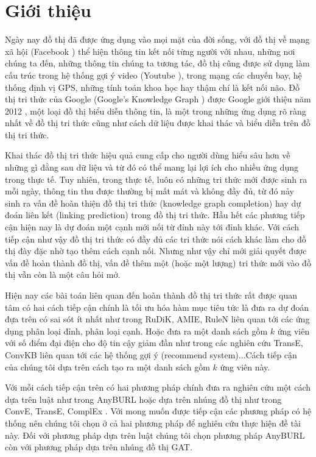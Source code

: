 \chapter{Giới thiệu}
\label{Chapter1}

Ngày nay đồ thị đã được ứng dụng vào mọi mặt của đời sống, với đồ thị về mạng xã hội (Facebook \cite{ugander2011anatomy}) thể hiện thông tin kết nối từng người với nhau, những nơi chúng ta đến, những thông tin chúng ta tương tác, đồ thị cũng được sử dụng làm cấu trúc trong hệ thống gợi ý video (Youtube \cite{baluja2008video}), trong mạng các chuyến bay, hệ thống định vị GPS, những tính toán khoa học hay thậm chí là kết nối não. Đồ thị tri thức của Google (Google's Knowledge Graph \cite{googlekg:2020}) được Google giới thiệu năm 2012 \cite{ji2020survey}, một loại đồ thị biểu diễn thông tin, là một trong những ứng dụng rõ ràng nhất về đồ thị tri thức cũng như cách dữ liệu được khai thác và biểu diễn trên đồ thị tri thức.

Khai thác đồ thị tri thức hiệu quả cung cấp cho người dùng hiểu sâu hơn về những gì đằng sau dữ liệu và từ đó có thể mang lại lợi ích cho nhiều ứng dụng trong thực tế. Tuy nhiên, trong thực tế, luôn có những tri thức mới được sinh ra mỗi ngày, thông tin thu được thường bị mất mát và không đầy đủ, từ đó nảy sinh ra vấn đề hoàn thiện đồ thị tri thức (knowledge graph completion) hay dự đoán liên kết (linking prediction) trong đồ thị tri thức.
Hầu hết các phương tiếp cận hiện nay là dự đoán một cạnh mới nối từ đỉnh này tới đỉnh khác. Với cách tiếp cận như vậy đồ thị tri thức có đầy đủ các tri thức nói cách khác làm cho đồ thị đày đặc nhờ tạo thêm cách cạnh nối. Nhưng như vậy chỉ mới giải quyết được vấn đề hoàn thành đồ thị, vấn đề thêm một (hoặc một lượng) tri thức mới vào đồ thị vẫn còn là một câu hỏi mở.

Hiện nay các bài toán liên quan đến hoàn thành đồ thị tri thức rất được quan tâm có hai cách tiếp cận chính là tối ưu hóa hàm mục tiêu tức là đưa ra dự đoán đựa trên có sai sót ít nhất như trong RuDiK\cite{ortona2018robust}, AMIE\cite{galarraga2015fast}, RuleN\cite{meilicke2018fine} liên quan tới các ứng dụng phân loại đỉnh, phân loại cạnh. Hoặc đưa ra một danh sách gồm \(k\) ứng viên với số điểm đại điện cho độ tin cậy giảm đần như trong các nghiên cứu TransE\cite{bordes2013translating}, ConvKB\cite{vu2019capsule} liên quan tới các hệ thống gợi ý (recommend system)...Cách tiếp cận của chúng tôi dựa trên cách tạo ra một danh sách gồm \(k\) ứng viên này.

Với mỗi cách tiếp cận trên có hai phương pháp chính đưa ra nghiên cứu một cách dựa trên luật như trong AnyBURL\cite{burl} hoặc dựa trên nhúng đồ thị như trong ConvE\cite{dettmers2017convolutional}, TransE\cite{bordes2013translating}, ComplEx \cite{trouillon2016complex}. Với mong muốn được tiếp cận các phương pháp có hệ thống nên chúng tôi chọn ở cả hai phương pháp để nghiên cứu thực hiện đề tài này. Đối với phương pháp dựa trên luật chúng tôi chọn phương pháp AnyBURL\cite{burl} còn với phương pháp dựa trên nhúng đồ thị GAT\cite{nathani2019learning}.

